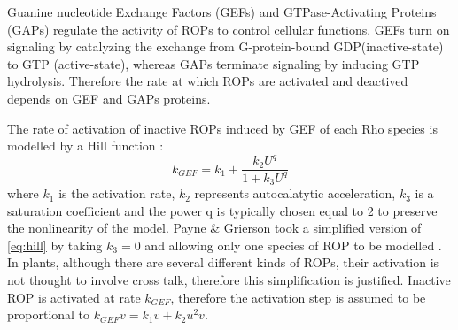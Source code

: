 Guanine nucleotide Exchange Factors (GEFs) and GTPase-Activating Proteins (GAPs) regulate the activity of ROPs to control cellular functions. GEFs turn on signaling by catalyzing the exchange from G-protein-bound GDP(inactive-state) to GTP (active-state), whereas GAPs terminate signaling by inducing GTP hydrolysis. Therefore the rate at which ROPs are activated and deactived depends on GEF and GAPs proteins.

The rate of activation of inactive ROPs induced by GEF of each Rho species is modelled by a Hill function \cite{phd:67_hill}:
\begin{equation}\label{eq:hill}
    k_{GEF} = k_1 + \frac{k_2 U^q}{1+k_3 U ^q}
\end{equation}
where $k_1$ is the activation rate, $k_2$ represents autocalatytic acceleration, $k_3$ is a saturation coefficient and the power q is typically chosen equal to 2 to preserve the nonlinearity of the model. Payne \& Grierson \cite{payne} took a simplified version of \eqref{eq:hill} by taking $k_3 = 0$ and allowing only one species of ROP to be modelled \cite{phd:67_hill}. In plants, although there are several different kinds of ROPs, their activation is not thought to involve cross talk, therefore this simplification is justified. Inactive ROP is activated at rate $k_{GEF}$, therefore the activation step is assumed to be proportional to $k_{GEF} v = k_1 v + k_2 u^2 v$.

